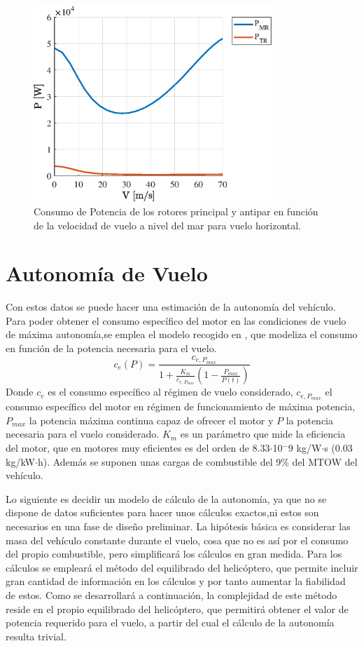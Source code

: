 \begin{figure}
	\centering
	\includegraphics[width=90mm]{graficos/PVH}
	\caption{Consumo de Potencia de los rotores principal y antipar en función de la velocidad de vuelo a nivel del mar para vuelo horizontal.}
	\label{PVH}
\end{figure}

\section{Autonomía de Vuelo}

Con estos datos se puede hacer una estimación de la autonomía del vehículo. 
Para poder obtener el consumo específico del motor en las condiciones de vuelo de máxima autonomía,se emplea el modelo recogido en \citet{Cuerva}, que modeliza el consumo en función de la potencia necesaria para el vuelo.
\begin{equation}
	c_e(P)=\frac{c_{e,P_{max}}}{1+\frac{K_m}{c_{e,P_{max}}}(1-\frac{P_{max}}{P(t)})}
	\label{consumo}
\end{equation}
Donde $c_e$ es el consumo específico al régimen de vuelo considerado, $c_{e,P_{max}}$ el consumo específico del motor en régimen de funcionamiento de máxima potencia, $P_{max}$ la potencia máxima continua capaz de ofrecer el motor y $P$ la potencia necesaria para el vuelo considerado.
$K_m$ es un parámetro que mide la eficiencia del motor, que en motores muy eficientes es del orden de 8.33$\cdot$10$^-9$ kg/W$\cdot$s (0.03 kg/kW$\cdot$h).
Además se suponen unas cargas de combustible del 9\% del MTOW del vehículo. 

Lo siguiente es decidir un modelo de cálculo de la autonomía, ya que no se dispone de datos suficientes para hacer unos cálculos exactos,ni estos son necesarios en una fase de diseño preliminar. La hipótesis básica es considerar las masa del vehículo constante durante el vuelo, cosa que no es así por el consumo del propio combustible, pero simplificará los cálculos en gran medida.
Para los cálculos se empleará el método del equilibrado del helicóptero, que permite incluir gran cantidad de información en los cálculos y por tanto aumentar la fiabilidad de estos. Como se desarrollará a continuación, la complejidad de este método reside en el propio equilibrado del helicóptero, que permitirá obtener el valor de potencia requerido para el vuelo, a partir del cual el cálculo de la autonomía resulta trivial.

